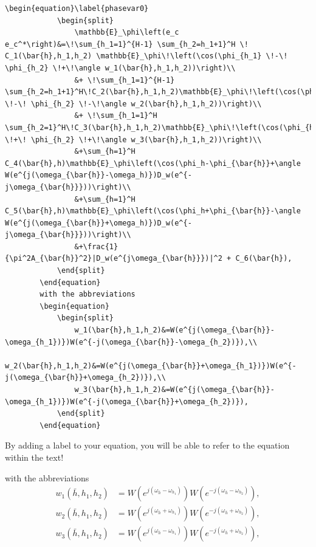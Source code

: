 \begin{mdframed}
	\begin{lstlisting}[language = Tex, caption={Add formulars to your text, splitted equations}]
		\begin{equation}\label{phasevar0}
			\begin{split}
				\mathbb{E}_\phi\left(e_c e_c^*\right)&=\!\sum_{h_1=1}^{H-1} \sum_{h_2=h_1+1}^H \! C_1(\bar{h},h_1,h_2) \mathbb{E}_\phi\!\left(\cos(\phi_{h_1} \!-\! \phi_{h_2} \!+\!\angle w_1(\bar{h},h_1,h_2))\right)\\
				&+ \!\sum_{h_1=1}^{H-1} \sum_{h_2=h_1+1}^H\!C_2(\bar{h},h_1,h_2)\mathbb{E}_\phi\!\left(\cos(\phi_{h_1} \!-\! \phi_{h_2} \!-\!\angle w_2(\bar{h},h_1,h_2))\right)\\
				&+ \!\sum_{h_1=1}^H \sum_{h_2=1}^H\!C_3(\bar{h},h_1,h_2)\mathbb{E}_\phi\!\left(\cos(\phi_{h_1} \!+\! \phi_{h_2} \!+\!\angle w_3(\bar{h},h_1,h_2))\right)\\
				&+\sum_{h=1}^H C_4(\bar{h},h)\mathbb{E}_\phi\left(\cos(\phi_h-\phi_{\bar{h}}+\angle W(e^{j(\omega_{\bar{h}}-\omega_h)})D_w(e^{-j\omega_{\bar{h}}}))\right)\\
				&+\sum_{h=1}^H C_5(\bar{h},h)\mathbb{E}_\phi\left(\cos(\phi_h+\phi_{\bar{h}}-\angle W(e^{j(\omega_{\bar{h}}+\omega_h)})D_w(e^{-j\omega_{\bar{h}}}))\right)\\
				&+\frac{1}{\pi^2A_{\bar{h}}^2}|D_w(e^{j\omega_{\bar{h}}})|^2 + C_6(\bar{h}),
			\end{split}
		\end{equation}
		with the abbreviations
		\begin{equation}
			\begin{split}
				w_1(\bar{h},h_1,h_2)&=W(e^{j(\omega_{\bar{h}}-\omega_{h_1})})W(e^{-j(\omega_{\bar{h}}-\omega_{h_2})}),\\
				w_2(\bar{h},h_1,h_2)&=W(e^{j(\omega_{\bar{h}}+\omega_{h_1})})W(e^{-j(\omega_{\bar{h}}+\omega_{h_2})}),\\
				w_3(\bar{h},h_1,h_2)&=W(e^{j(\omega_{\bar{h}}-\omega_{h_1})})W(e^{-j(\omega_{\bar{h}}+\omega_{h_2})}),
			\end{split}
		\end{equation}
	\end{lstlisting}
	By adding a label to your equation, you will be able to refer to the equation within the text!
\end{mdframed}
with the abbreviations
\begin{equation}
	\begin{split}
		w_1(\bar{h},h_1,h_2)&=W(e^{j(\omega_{\bar{h}}-\omega_{h_1})})W(e^{-j(\omega_{\bar{h}}-\omega_{h_2})}),\\
		w_2(\bar{h},h_1,h_2)&=W(e^{j(\omega_{\bar{h}}+\omega_{h_1})})W(e^{-j(\omega_{\bar{h}}+\omega_{h_2})}),\\
		w_3(\bar{h},h_1,h_2)&=W(e^{j(\omega_{\bar{h}}-\omega_{h_1})})W(e^{-j(\omega_{\bar{h}}+\omega_{h_2})}),
	\end{split}
\end{equation}
